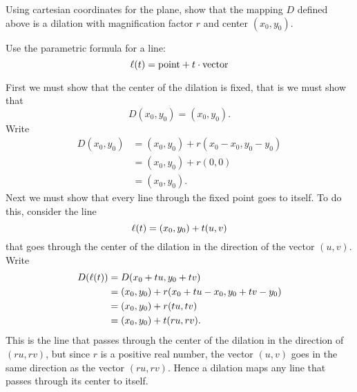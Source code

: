 \documentclass[newpage,hints,handout,12pt,noauthor,nooutcomes]{ximera}
\begin{document}
\begin{problem}
Using cartesian coordinates for the plane, show that the mapping $D$
defined above is a dilation with magnification factor $r$ and center
$\left( x_{0},y_{0}\right) $.
\begin{hint}
  Use the parametric formula for a line:
  \[
  \ell(t) = \text{point} + t \cdot \text{vector}
  \]
\end{hint}
\begin{freeResponse}
First we must show that the center of the dilation is fixed, that is we must show that 
\[
D(x_0,y_0) = (x_0,y_0).
\]
Write
\begin{align*}
D(x_0,y_0) &= (x_0,y_0) + r(x_0-x_0,y_0-y_0)\\
&= (x_0,y_0) + r(0,0)\\
&=(x_0,y_0).
\end{align*}
Next we must show that every line through the fixed point goes to
itself. To do this, consider the line
\[
\ell(t) = (x_0,y_0) + t(u,v)
\]
that goes through the center of the dilation in the direction of the
vector $(u,v)$. Write
\begin{align*}
D(\ell(t)) &= D(x_0+tu,y_0+tv)\\
&= (x_0,y_0) + r(x_0+tu-x_0,y_0+tv-y_0)\\
&= (x_0,y_0) + r(tu,tv)\\
&= (x_0,y_0) + t(ru,rv). 
\end{align*}
This is the line that passes through the center of the dilation in the
direction of $(ru,rv)$, but since $r$ is a positive real number, the
vector $(u,v)$ goes in the same direction as the vector
$(ru,rv)$. Hence a dilation maps any line that passes through its
center to itself.


\end{freeResponse}
\end{problem}
\end{document}

